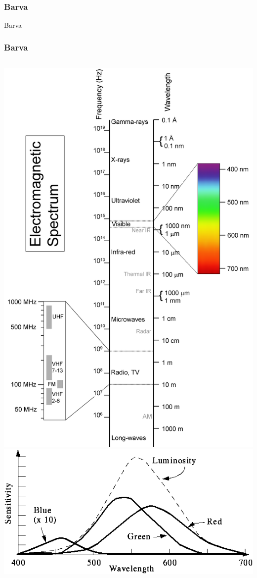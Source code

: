 \begin{frame}
\frametitle{Barva}
\begin{center}
\Huge {\color{white}Barva}
\end{center}
\end{frame}


\begin{frame}
    \frametitle{Barva}
    \begin{columns}[c]
        \includegraphics[height=\textheight]{pics/color/Electromagnetic-Spectrum}
        \includegraphics[width=\textwidth]{pics/color/citlivost-oka}


\end{columns}
\end{frame}
